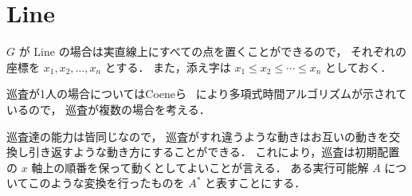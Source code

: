 




\section{Line}

$G$ が Line の場合は実直線上にすべての点を置くことができるので，
それぞれの座標を $x_1, x_2, \ldots, x_n$ とする．
また，添え字は $x_1 \leq x_2 \leq \cdots \leq x_n$ としておく．

巡査が1人の場合についてはCoeneら~\cite{coene2013balancing}
により多項式時間アルゴリズムが示されているので，
巡査が複数の場合を考える．

巡査達の能力は皆同じなので，
巡査がすれ違うような動きはお互いの動きを交換し引き返すような動き方にすることができる．
これにより，巡査は初期配置の $x$ 軸上の順番を保って動くとしてよいことが言える．
ある実行可能解 $A$ についてこのような変換を行ったものを $A^*$ と表すことにする．



